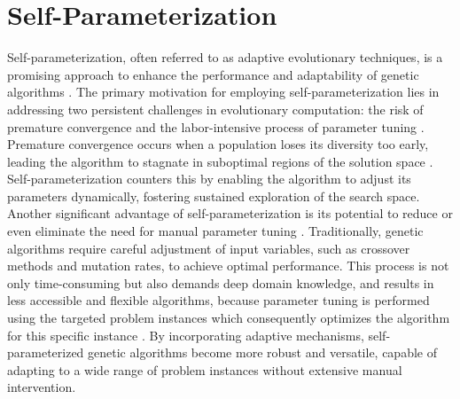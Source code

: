 \documentclass[english,examples]{isasthesis}
\begin{document}
\begin{minipage}{\textwidth}
    \begin{Example}
        \begin{minipage}{\textwidth}
            \centering
            
            \label{ex:move_sub_event_blocks}
        \end{minipage}
    \end{Example}
\end{minipage}


\chapter{Self-Parameterization}
Self-parameterization, often referred to as adaptive evolutionary techniques,
is a promising approach to enhance the performance and adaptability of genetic
algorithms \cite{Katoch2021,quaer2024survey}.
The primary motivation for employing self-parameterization lies in addressing
two persistent challenges in evolutionary computation: the risk of premature
convergence and the labor-intensive process of parameter tuning
\cite{back1994selective,Katoch2021,Affenzeller2009}.
%
Premature convergence occurs when a population loses its diversity too early,
leading the algorithm to stagnate in suboptimal regions of the solution space
\cite{Affenzeller2009}.
Self-parameterization counters this by enabling the algorithm to adjust its
parameters dynamically, fostering sustained exploration of the search space.
%
Another significant advantage of self-parameterization is its potential to
reduce or even eliminate the need for manual parameter tuning \cite{Katoch2021}.
Traditionally, genetic algorithms require careful adjustment of input variables,
such as crossover methods and mutation rates, to achieve optimal performance.
This process is not only time-consuming but also demands deep domain knowledge,
and results in less accessible and flexible algorithms, because parameter tuning
is performed using the targeted problem instances which consequently optimizes
the algorithm for this specific instance \cite{quaer2024survey}.
By incorporating adaptive mechanisms, self-parameterized genetic algorithms
become more robust and versatile, capable of adapting to a wide range of problem
instances without extensive manual intervention.
\end{document}
